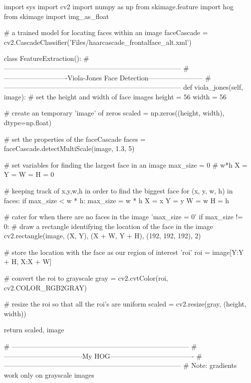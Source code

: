     
        \begin{pythoncode}    
import sys
import cv2
import numpy as np
from skimage.feature import hog
from skimage import img_as_float

# a trained model for locating faces within an image
faceCascade = cv2.CascadeClassifier('Files/haarcascade_frontalface_alt.xml')

class FeatureExtraction():
    # ------------------------------------------------------------------------------
    # ----------------------------Viola-Jones Face Detection------------------------
    # ------------------------------------------------------------------------------
    def viola_jones(self, image):
        # set the height and width of face images
        height = 56
        width = 56
		
        # create an temporary 'image' of zeros
        scaled = np.zeros((height, width), dtype=np.float)
		
        # set the properties of the faceCascade
        faces = faceCascade.detectMultiScale(image, 1.3, 5)

        # set variables for finding the largest face in an image 
        max_size = 0  # w*h
        X = Y = W = H = 0
		
        # keeping track of x,y,w,h in order to find the biggest face
        for (x, y, w, h) in faces:  
            if max_size < w * h:
                max_size = w * h
                X = x
                Y = y
                W = w
                H = h
				
        # cater for when there are no faces in the image 'max_size = 0'
        if max_size != 0:
            # draw a rectangle identifying the location of the face in the image
            cv2.rectangle(image, (X, Y), (X + W, Y + H), (192, 192, 192), 2)
			
            # store the location with the face as our region of interest 'roi'
            roi = image[Y:Y + H, X:X + W]
			
            # convert the roi to grayscale
            gray = cv2.cvtColor(roi, cv2.COLOR_RGB2GRAY)
			
            # resize the roi so that all the roi's are uniform
            scaled = cv2.resize(gray, (height, width))

        return scaled, image

    # ------------------------------------------------------------------------------
    # -----------------------------------My HOG-------------------------------------
    # ------------------------------------------------------------------------------
    # Note: gradients work only on grayscale images


\end{pythoncode}
